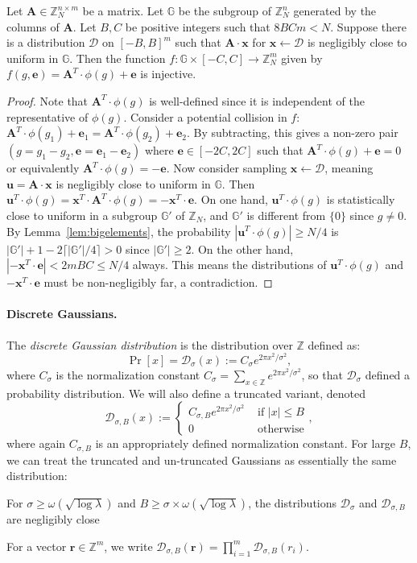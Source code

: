 \documentclass{article}\usepackage[a4paper,margin=20mm]{geometry}
\numberwithin{theorem}{section}
\numberwithin{equation}{section}
\newcommand{\Z}{\mathbb{Z}}
\newcommand{\G}{\mathbb{G}}
\newcommand{\ev}{{\mathbf{e}}}
\newcommand{\rv}{{\mathbf{r}}}
\newcommand{\uv}{{\mathbf{u}}}
\newcommand{\xv}{{\mathbf{x}}}
\newcommand{\Am}{{\mathbf{A}}}
\newcommand{\Ds}{{\mathcal{D}}}
\begin{document}
\begin{lemma}\label{lem:far}Let $\Am\in\Z_N^{n\times m}$ be a matrix. Let $\G$ be the subgroup of $\Z_N^n$ generated by the columns of $\Am$. Let $B,C$ be positive integers such that $8BCm< N$. Suppose there is a distribution $\Ds$ on $[-B,B]^m$ such that $\Am\cdot \xv$ for $\xv\gets\Ds$ is negligibly close to uniform in $\G$. Then the function $f:\G\times[-C,C]\rightarrow\Z_N^m$ given by $f(g,\ev)=\Am^T\cdot\phi(g)+\ev$ is injective.
\end{lemma}
\begin{proof}Note that $\Am^T\cdot\phi(g)$ is well-defined since it is independent of the representative of $\phi(g)$. Consider a potential collision in $f$: $\Am^T\cdot\phi(g_1)+\ev_1=\Am^T\cdot\phi(g_2)+\ev_2$. By subtracting, this gives a non-zero pair $(g=g_1-g_2,\ev=\ev_1-\ev_2)$ where $\ev\in[-2C,2C]$ such that $\Am^T\cdot\phi(g)+\ev=0$ or equivalently $\Am^T\cdot\phi(g)=-\ev$. Now consider sampling $\xv\gets\Ds$, meaning $\uv=\Am\cdot\xv$ is negligibly close to uniform in $\G$. Then $\uv^T\cdot\phi(g)=\xv^T\cdot\Am^T\cdot\phi(g)=-\xv^T\cdot\ev$. On one hand, $\uv^T\cdot\phi(g)$ is statistically close to uniform in a subgroup $\G'$ of $\Z_N$, and $\G'$ is different from $\{0\}$ since $g\neq 0$. By Lemma~\ref{lem:bigelements}, the probability $|\uv^T\cdot\phi(g)|\geq N/4$ is $|\G'|+1-2\lceil|\G'|/4\rceil>0$ since $|\G'|\geq 2$. On the other hand, $|-\xv^T\cdot\ev|<2mBC\leq N/4$ always. This means the distributions of $\uv^T\cdot\phi(g)$ and $-\xv^T\cdot\ev$ must be non-negligibly far, a contradiction.
\end{proof}




\paragraph{Discrete Gaussians.} The \emph{discrete Gaussian distribution} is the distribution over $\Z$ defined as:
\[\Pr[x]=\Ds_\sigma(x):=C_\sigma e^{2\pi x^2/\sigma^2},\]
where $C_\sigma$ is the normalization constant $C_\sigma=\sum_{x\in\Z}e^{2\pi x^2/\sigma^2}$, so that $\Ds_\sigma$ defined a probability distribution. We will also define a truncated variant, denoted
\[\Ds_{\sigma,B}(x):=\begin{cases}C_{\sigma,B} e^{2\pi x^2/\sigma^2}&\text{ if }|x|\leq B\\0&\text{ otherwise}\end{cases},\]
where again $C_{\sigma,B}$ is an appropriately defined normalization constant. For large $B$, we can treat the truncated and un-truncated Gaussians as essentially the same distribution:
\begin{fact}For $\sigma\geq\omega(\sqrt{\log\lambda})$ and $B\geq \sigma\times\omega(\sqrt{\log\lambda})$, the distributions $\Ds_{\sigma}$ and $\Ds_{\sigma,B}$ are negligibly close
\end{fact}
\noindent For a vector $\rv\in\Z^m$, we write $\Ds_{\sigma,B}(\rv)=\prod_{i=1}^m\Ds_{\sigma,B}(r_i)$.
\end{document}
